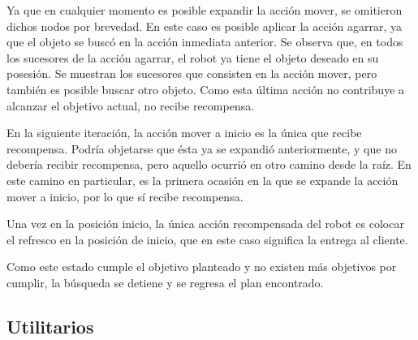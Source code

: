 \documentclass[11pt]{article}
\begin{document}
Ya que en cualquier momento es posible expandir la acción mover, se omitieron dichos nodos por brevedad. En este caso es posible aplicar la acción agarrar, ya que el objeto se buscó en la acción inmediata anterior. Se observa que, en todos los sucesores de la acción agarrar, el robot ya tiene el objeto deseado en su posesión. Se muestran los sucesores que consisten en la acción mover, pero también es posible buscar otro objeto. Como esta última acción no contribuye a alcanzar el objetivo actual, no recibe recompensa.

En la siguiente iteración, la acción mover a inicio es la única que recibe recompensa. Podría objetarse que ésta ya se expandió anteriormente, y que no debería recibir recompensa, pero aquello ocurrió en otro camino desde la raíz. En este camino en particular, es la primera ocasión en la que se expande la acción mover a inicio, por lo que sí recibe recompensa.

Una vez en la posición inicio, la única acción recompensada del robot es colocar el refresco en la posición de inicio, que en este caso significa la entrega al cliente.

Como este estado cumple el objetivo planteado y no existen más objetivos por cumplir, la búsqueda se detiene y se regresa el plan encontrado.

\subsection{Utilitarios}
\end{document}
